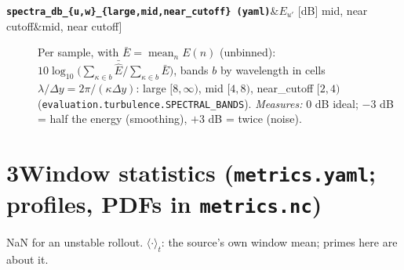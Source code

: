 \documentclass[10pt]{article}
\newcommand{\metric}[2]{\item[{\texttt{\textbf{#1}}\ifx&#2&\else\quad[table: #2]\fi}]}
\newcommand{\meas}{\emph{Measures:} }
\newcommand{\pred}[1]{\hat{#1}}
\DeclareMathOperator*{\mean}{mean}
\begin{document}
\begin{description}
\metric{spectra\_db\_\{u,w\}\_\{large,mid,near\_cutoff\} \textnormal{(yaml)}}{$E_{u'}$ [dB] mid, near cutoff}
  Per sample, with $\bar E = \mean_n E(n)$ (unbinned):
  $10\log_{10}\bigl(\sum_{\kappa\in b}\bar{\pred E} / \sum_{\kappa\in b}\bar E\bigr)$,
  bands $b$ by wavelength in cells $\lambda/\Delta y = 2\pi/(\kappa\Delta y)$:
  large $[8,\infty)$, mid $[4,8)$, near\_cutoff $[2,4)$
  (\texttt{evaluation.turbulence.SPECTRAL\_BANDS}). \meas 0 dB ideal;
  $-3$ dB = half the energy (smoothing), $+3$ dB = twice (noise).
\end{description}

\section*{3\quad Window statistics (\texttt{metrics.yaml}; profiles, PDFs in \texttt{metrics.nc})}
NaN for an unstable rollout. $\langle\cdot\rangle_t$: the source's own window
mean; primes here are about it.
\end{document}
